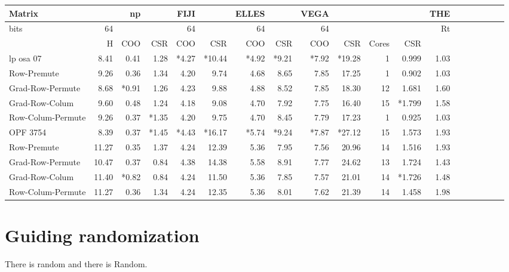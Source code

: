 \documentclass[manuscript,screen]{acmart}
\begin{document}
\begin{table}[hbt]
  \begin{tabular}{lrrrrrrrrrrrrrrrrrr}
    Matrix           &       &   np  &         & FIJI &        &ELLES  &       & VEGA  &         &      &          & THE   &       & \\ \hline
    bits             & 64    &       &         & 64   &        &64     &       &64     &         &      &          & Rt \\ \hline    
                     & H     &   COO &  CSR    & COO  & CSR    &COO    &CSR    &COO    &  CSR    &Cores &   CSR    &  \\ \hline    
lp osa 07            & 8.41  &  0.41 &  1.28   &*4.27 &*10.44  &*4.92  &*9.21  &*7.92  & *19.28  &   1  &  0.999   &1.03  \\       
Row-Premute          & 9.26  &  0.36 &  1.34   & 4.20 &  9.74  & 4.68  & 8.65  & 7.85  &  17.25  &   1  &  0.902   &1.03  \\       
Grad-Row-Permute     & 8.68  & *0.91 &  1.26   & 4.23 &  9.88  & 4.88  & 8.52  & 7.85  &  18.30  &  12  &  1.681   &1.60  \\       
Grad-Row-Colum       & 9.60  &  0.48 &  1.24   & 4.18 &  9.08  & 4.70  & 7.92  & 7.75  &  16.40  &  15  & *1.799   &1.58  \\       
Row-Colum-Permute    & 9.26  &  0.37 & *1.35   & 4.20 &  9.75  & 4.70  & 8.45  & 7.79  &  17.23  &   1  &  0.925   &1.03  \\ \hline
OPF 3754             & 8.39  &  0.37 & *1.45   &*4.43 &*16.17  &*5.74  &*9.24  &*7.87  & *27.12  &  15  &  1.573   &1.93  \\       
Row-Premute          &11.27  &  0.35 &  1.37   & 4.24 & 12.39  & 5.36  & 7.95  & 7.56  &  20.96  &  14  &  1.516   &1.93  \\       
Grad-Row-Permute     &10.47  &  0.37 &  0.84   & 4.38 & 14.38  & 5.58  & 8.91  & 7.77  &  24.62  &  13  &  1.724   &1.43  \\       
Grad-Row-Colum       &11.40  & *0.82 &  0.84   & 4.24 & 11.50  & 5.36  & 7.85  & 7.57  &  21.01  &  14  & *1.726   &1.48  \\       
Row-Colum-Permute    &11.27  &  0.36 &  1.34   & 4.24 & 12.35  & 5.36  & 8.01  & 7.62  &  21.39  &  14  &  1.458   &1.98  \\ \hline
  \end{tabular}
  \end{table}


\section{Guiding randomization}
\label{sec:guide}
There is random and there is Random.
\end{document}
